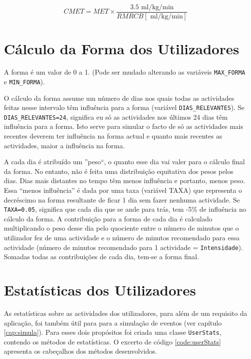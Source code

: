 \documentclass[a4paper,10pt]{report}
\begin{document}
\begin{equation} \label{eq:CMET} 
CMET = MET \times \frac{3.5 \text{ ml/kg/min}}{RMRCB [\text{ ml/kg/min}]}
\end{equation}

\chapter{Cálculo da Forma dos Utilizadores}
\label{cap:forma}
A forma é um valor de 0 a 1. (Pode ser mudado alterando as variáveis \verb!MAX_FORMA! e \verb!MIN_FORMA!).

O cálculo da forma assume um número de dias nos quais todas as actividades feitas nesse intervalo têm influência para a forma 
(variável \verb!DIAS_RELEVANTES!). Se \verb!DIAS_RELEVANTES=24!, significa eu só as actividades nos últimos 24 dias têm influência para a forma.  
Isto serve para simular o facto de só as actividades mais recentes deverem ter influência na forma actual e quanto mais recentes as 
actividades, maior a influência na forma.

A cada dia é atribuído um ''peso``, o quanto esse dia vai valer para o cálculo final da forma. 
No entanto, não é feita uma distribuição equitativa dos pesos pelos dias. Dias mais distantes no tempo têm menos influência e portanto, 
menos peso. Essa “menos influência” é dada por uma taxa (variável TAXA) que representa o decréscimo na forma resultante de ficar 1 dia sem 
fazer nenhuma actividade. Se \verb!TAXA=0.05!, significa que cada dia que se ande para trás, tem -5\% de influência no cálculo da forma.
A contribuição para a forma de cada dia é calculado multiplicando o peso desse dia pelo quociente entre o número de minutos que o utilizador 
fez de uma actividade e o número de minutos recomendado para essa actividade (número de minutos recomendado para 1 actividade = \verb!Intensidade!). 
Somadas todas as contribuições de cada dia, tem-se a forma final.

\chapter{Estatísticas dos Utilizadores}
\label{cap:estatisticas}
As estatísticas sobre as actividades dos utilizadores, para além de um requisito da aplicação, 
foi também útil para para a simulação de eventos (ver capítulo \ref{cap:simula}). 
Para esses dois propósitos foi criada uma classe \verb!UserStats!, contendo os métodos de estatísticas. 
O excerto de código \ref{code:userStats} apresenta os cabeçalhos dos métodos desenvolvidos.
\end{document}
